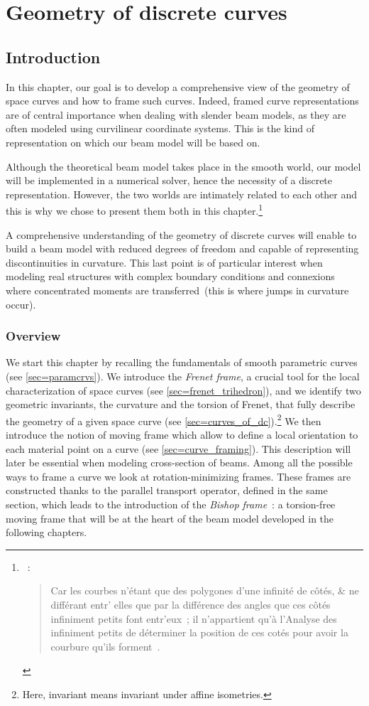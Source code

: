 
\chapter{Geometry of discrete curves}\label{chp=curve}
\section{Introduction}
In this chapter, our goal is to develop a comprehensive view of the geometry of space curves and how to frame such curves. Indeed, framed curve representations are of central importance when dealing with slender beam models, as they are often modeled using curvilinear coordinate systems. This is the kind of representation on which our beam model will be based on.

Although the theoretical beam model takes place in the smooth world, our model will be implemented in a numerical solver, hence the necessity of a discrete representation. However, the two worlds are intimately related to each other and this is why we chose to present them both in this chapter.\footnote{~: \blockquote{Car les courbes n’étant que des polygones d’une infinité de côtés, \& ne différant
entr' elles que par la différence des angles que ces côtés infiniment petits font
entr'eux~; il n’appartient qu’à l’Analyse des infiniment petits de déterminer la
position de ces cotés pour avoir la courbure qu’ils forment~\belp{}.}}

A comprehensive understanding of the geometry of discrete curves will enable to build a beam model with reduced degrees of freedom and capable of representing discontinuities in curvature. This last point is of particular interest when modeling real structures with complex boundary conditions and connexions where concentrated moments are transferred~(this is where jumps in curvature occur).

\subsection{Overview}
We start this chapter by recalling the fundamentals of smooth parametric curves (see \cref{sec=paramcrvs}). We introduce the \emph{Frenet frame}, a crucial tool for the local characterization of space curves (see \cref{sec=frenet_trihedron}), and we identify two geometric invariants, the curvature and the torsion of Frenet, that fully describe the geometry of a given space curve (see \cref{sec=curves_of_dc}).\footnote{Here, invariant means invariant under affine isometries.} We then introduce the notion of moving frame which allow to define a local orientation to each material point on a curve (see \cref{sec=curve_framing}). This description will later be essential when modeling cross-section of beams. Among all the possible ways to frame a curve we look at rotation-minimizing frames. These frames are constructed thanks to the parallel transport operator, defined in the same section, which leads to the introduction of the \emph{Bishop frame}~: a torsion-free moving frame that will be at the heart of the beam model developed in the following chapters.

